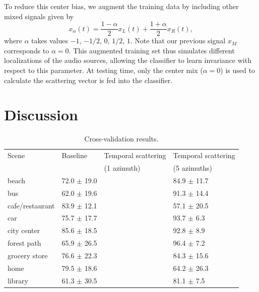 \documentclass{article}
\begin{document}
\begin{sloppy}
To reduce this center bias, we augment the training data by including other mixed signals given by
\begin{equation}
	x_\alpha(t) = \frac{1-\alpha}{2} x_L(t) + \frac{1+\alpha}{2} x_R(t),
\end{equation}
where $\alpha$ takes values $-1$, $-1/2$, $0$, $1/2$, $1$. Note that our previous signal $x_M$ corresponds to $\alpha = 0$. This augmented training set thus simulates different localizations of the audio sources, allowing the classifier to learn invariance with respect to this parameter. At testing time, only the center mix ($\alpha = 0$) is used to calculate the scattering vector is fed into the classifier.

\section{Discussion}

\begin{table}[!htbp]
\centering
\caption{
Cross-validation results.
\label{table:single-label-durations}}
\begin{tabular}{llll}
\toprule
Scene & Baseline & Temporal scattering & Temporal scattering \\
           &               &  (1 azimuth)  & (5 azimuths) \\
\midrule
beach & 72.0 $\pm$ 19.0 & & 84.9 $\pm$ 11.7 \\

bus & 62.0 $\pm$ 19.6 & & 91.3 $\pm$ 14.4 \\

cafe/restaurant & 83.9 $\pm$ 12.1 & & 57.1 $\pm$ 20.5 \\

car & 75.7 $\pm$ 17.7 & & 93.7 $\pm$  \phantom{0}6.3 \\

city center & 85.6 $\pm$ 18.5 & & 92.8 $\pm$  \phantom{0}8.9 \\

forest path & 65.9 $\pm$ 26.5 & & 96.4 $\pm$  \phantom{0}7.2 \\

grocery store & 76.6 $\pm$ 22.3 & & 84.3 $\pm$ 15.6 \\

home & 79.5 $\pm$ 18.6 & & 64.2 $\pm$ 26.3 \\

library & 61.3 $\pm$ 30.5 & & 81.1 $\pm$  \phantom{0}7.5 \\


\end{tabular}
\end{table}
\end{sloppy}
\end{document}
